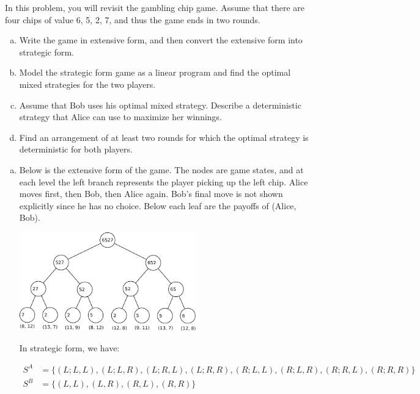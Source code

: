 \documentclass[fleqn]{homework}
\begin{document}
  \begin{problem}{2}
    \begin{question}
      In this problem, you will revisit the gambling chip game.  Assume that
      there are four chips of value 6, 5, 2, 7, and thus the game ends in two
      rounds.

      \begin{enumerate}[a.]
      \item Write the game in extensive form, and then convert the extensive
        form into strategic form.
      \item Model the strategic form game as a linear program and find the
        optimal mixed strategies for the two players.
      \item Assume that Bob uses his optimal mixed strategy.  Describe a
        deterministic strategy that Alice can use to maximize her winnings.
      \item Find an arrangement of at least two rounds for which the optimal
        strategy is deterministic for both players.
      \end{enumerate}
    \end{question}

    \begin{enumerate}[a.]
    \item Below is the extensive form of the game.  The nodes are game states,
      and at each level the left branch represents the player picking up the
      left chip.  Alice moves first, then Bob, then Alice again.  Bob's final
      move is not shown explicitly since he has no choice.  Below each leaf are
      the payoffs of (Alice, Bob).

      \includegraphics[width=0.6\textwidth]{p2_extensive.pdf}

      In strategic form, we have:

      \begin{align*}
        S^A &= \{(L; L, L), (L; L, R), (L; R, L), (L; R, R), 
                 (R; L, L), (R; L, R), (R; R, L), (R; R, R)\} \\
        S^B &= \{(L, L), (L, R), (R, L), (R, R)\} \\
      \end{align*}


\end{enumerate}
\end{problem}
\end{document}
